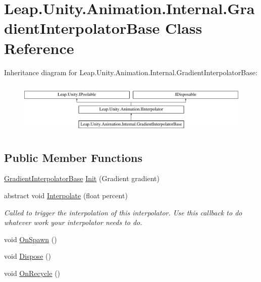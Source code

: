 \hypertarget{class_leap_1_1_unity_1_1_animation_1_1_internal_1_1_gradient_interpolator_base}{}\section{Leap.\+Unity.\+Animation.\+Internal.\+Gradient\+Interpolator\+Base Class Reference}
\label{class_leap_1_1_unity_1_1_animation_1_1_internal_1_1_gradient_interpolator_base}
Inheritance diagram for Leap.\+Unity.\+Animation.\+Internal.\+Gradient\+Interpolator\+Base\+:\begin{figure}[H]
\begin{center}
\leavevmode
\includegraphics[height=2.553191cm]{class_leap_1_1_unity_1_1_animation_1_1_internal_1_1_gradient_interpolator_base}
\end{center}
\end{figure}
\subsection*{Public Member Functions}
\begin{DoxyCompactItemize}
\item 
\mbox{\hyperlink{class_leap_1_1_unity_1_1_animation_1_1_internal_1_1_gradient_interpolator_base}{Gradient\+Interpolator\+Base}} \mbox{\hyperlink{class_leap_1_1_unity_1_1_animation_1_1_internal_1_1_gradient_interpolator_base_a6bbc175a75bde39aee6eb0d46b07f2ba}{Init}} (Gradient gradient)
\item 
abstract void \mbox{\hyperlink{class_leap_1_1_unity_1_1_animation_1_1_internal_1_1_gradient_interpolator_base_a21af3d1e1373cd6c18a4342952220873}{Interpolate}} (float percent)
\begin{DoxyCompactList}\small\item\em Called to trigger the interpolation of this interpolator. Use this callback to do whatever work your interpolator needs to do. \end{DoxyCompactList}\item 
void \mbox{\hyperlink{class_leap_1_1_unity_1_1_animation_1_1_internal_1_1_gradient_interpolator_base_a51da8752a502f327aaaa8b9d91baf796}{On\+Spawn}} ()
\item 
void \mbox{\hyperlink{class_leap_1_1_unity_1_1_animation_1_1_internal_1_1_gradient_interpolator_base_ac4a403d938f0487355ed7f25b9fbea43}{Dispose}} ()
\item 
void \mbox{\hyperlink{class_leap_1_1_unity_1_1_animation_1_1_internal_1_1_gradient_interpolator_base_a4359819686a6c4def43967685c12f09c}{On\+Recycle}} ()
\end{DoxyCompactItemize}
